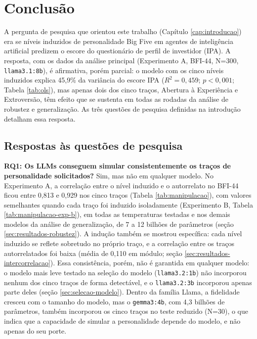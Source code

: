 \chapter{Conclusão}
\label{cap:conclusao}

A pergunta de pesquisa que orientou este trabalho (Capítulo
\ref{cap:introducao}) era se níveis induzidos de personalidade Big Five em
agentes de inteligência artificial predizem o escore do questionário de
perfil de investidor (IPA). A resposta, com os dados da análise principal
(Experimento A, BFI-44, N=300, \texttt{llama3.1:8b}), é afirmativa, porém
parcial: o modelo com os cinco níveis induzidos explica 45,9\% da
variância do escore IPA ($R^2=0{,}459$; $p<0{,}001$; Tabela \ref{tab:ols}),
mas apenas dois dos cinco traços, Abertura à Experiência e Extroversão,
têm efeito que se sustenta em todas as rodadas da análise de robustez e
generalização. As três questões de pesquisa definidas na introdução
detalham essa resposta.

\section{Respostas às questões de pesquisa}

\textbf{RQ1: Os LLMs conseguem simular consistentemente os traços de
personalidade solicitados?} Sim, mas não em qualquer modelo. No
Experimento A, a correlação entre o nível induzido e o autorrelato no
BFI-44 ficou entre 0,813 e 0,929 nos cinco traços (Tabela
\ref{tab:manipulacao}), com valores semelhantes quando cada traço foi
induzido isoladamente (Experimento B, Tabela \ref{tab:manipulacao-exp-b}),
em todas as temperaturas testadas e nos demais modelos da análise de
generalização, de 7 a 12 bilhões de parâmetros (seção
\ref{sec:resultados-robustez}). A indução também
se mostrou específica: cada nível induzido se reflete sobretudo no
próprio traço, e a correlação entre os traços autorrelatados foi baixa
(média de 0,110 em módulo; seção \ref{sec:resultados-intercorrelacao}).
Essa consistência, porém, não é garantida em qualquer modelo: o modelo
mais leve testado na seleção do modelo (\texttt{llama3.2:1b}) não
incorporou nenhum dos cinco traços de forma detectável, e o
\texttt{llama3.2:3b} incorporou apenas parte deles (seção
\ref{sec:selecao-modelo}). Dentro da família Llama, a fidelidade cresceu
com o tamanho do modelo, mas o \texttt{gemma3:4b}, com 4,3 bilhões de
parâmetros, também incorporou os cinco traços no teste reduzido (N=30),
o que indica que a capacidade de simular a personalidade depende do
modelo, e não apenas do seu porte.

